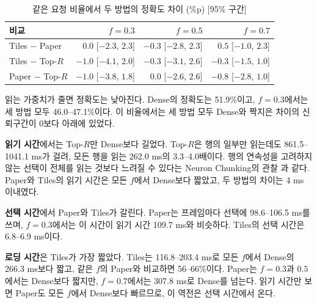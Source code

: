 \begin{table}[htbp]
    \centering
    \caption{같은 요청 비율에서 두 방법의 정확도 차이 (\%p) [95\% 구간]}
    \label{tab:paired}
    \begin{tabular}{lrrr}
        \toprule
        비교 & $f=0.3$ & $f=0.5$ & $f=0.7$ \\
        \midrule
        Tiles $-$ Paper & $0.0$ [$-2.3$, $2.3$] & $-0.3$ [$-2.8$, $2.3$] & $0.5$ [$-1.0$, $2.3$] \\
        Tiles $-$ Top-$R$ & $-1.0$ [$-4.1$, $2.0$] & $-0.3$ [$-3.1$, $2.6$] & $-0.3$ [$-1.5$, $1.0$] \\
        Paper $-$ Top-$R$ & $-1.0$ [$-3.8$, $1.8$] & $0.0$ [$-2.6$, $2.6$] & $-0.8$ [$-2.8$, $1.0$] \\
        \bottomrule
    \end{tabular}
\end{table}

읽는 가중치가 줄면 정확도는 낮아진다. Dense의 정확도는 51.9\%이고, $f=0.3$에서는 세 방법 모두 46.0--47.1\%이다. 이 비율에서는 세 방법 모두 Dense와 짝지은 차이의 신뢰구간이 0보다 아래에 있었다.

\textbf{읽기 시간}에서는 Top-$R$만 Dense보다 길었다. Top-$R$은 행의 일부만 읽는데도 861.5--1041.1 ms가 걸려, 모든 행을 읽는 262.0 ms의 3.3--4.0배이다. 행의 연속성을 고려하지 않는 선택이 전체를 읽는 것보다 느려질 수 있다는 Neuron Chunking의 관찰 \cite{yang2025}과 같다. Paper와 Tiles의 읽기 시간은 모든 $f$에서 Dense보다 짧았고, 두 방법의 차이는 4 ms 이내였다.

\textbf{선택 시간}에서 Paper와 Tiles가 갈린다. Paper는 프레임마다 선택에 98.6--106.5 ms를 쓰며, $f=0.3$에서는 이 시간이 읽기 시간 109.7 ms와 비슷하다. Tiles의 선택 시간은 6.8--6.9 ms이다.

\textbf{로딩 시간}은 Tiles가 가장 짧았다. Tiles는 116.8--203.4 ms로 모든 $f$에서 Dense의 266.3 ms보다 짧고, 같은 $f$의 Paper와 비교하면 56--66\%이다. Paper는 $f=0.3$과 $0.5$에서는 Dense보다 짧지만, $f=0.7$에서는 307.8 ms로 Dense를 넘는다. 읽기 시간만 보면 Paper도 모든 $f$에서 Dense보다 빠르므로, 이 역전은 선택 시간에서 온다.

